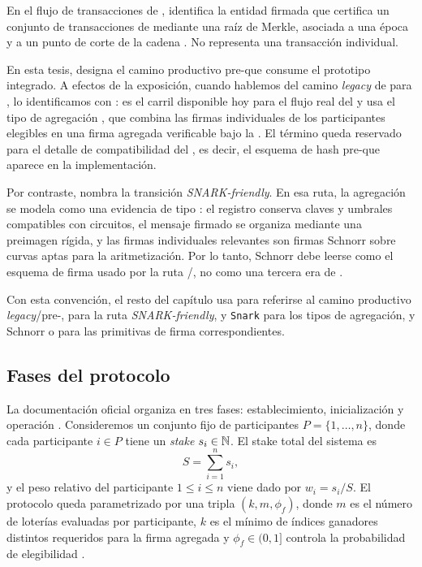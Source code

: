 En el flujo de transacciones de \Mithril, \CardanoTransactions identifica la entidad firmada que certifica un conjunto de transacciones de \Cardano mediante una raíz de Merkle, asociada a una época y a un punto de corte de la cadena \cite{MithrilDocsTransactions}. No representa una transacción individual.

En esta tesis, \Pythagoras designa el camino productivo pre-\Lagrange que consume el prototipo integrado. A efectos de la exposición, cuando hablemos del camino \textit{legacy} de \Mithril para \CardanoTransactions, lo identificamos con \Pythagoras: es el carril disponible hoy para el flujo real del \MithrilAggregator y usa el tipo de agregación \Concatenation, que combina las firmas individuales \BLS de los participantes elegibles en una firma agregada verificable bajo la \AVK \cite{MithrilSTMRepo}. El término \LegacyHashScheme queda reservado para el detalle de compatibilidad del \ProtocolMsg, es decir, el esquema de hash pre-\Lagrange que aparece en la implementación.

Por contraste, \Lagrange nombra la transición \textit{SNARK-friendly}. En esa ruta, la agregación se modela como una evidencia de tipo \SNARK: el registro conserva claves y umbrales compatibles con circuitos, el mensaje firmado se organiza mediante una preimagen rígida, y las firmas individuales relevantes son firmas Schnorr sobre curvas aptas para la aritmetización. Por lo tanto, Schnorr debe leerse como el esquema de firma usado por la ruta \Lagrange/\SNARK, no como una tercera era de \Mithril.

Con esta convención, el resto del capítulo usa \Pythagoras para referirse al camino productivo \textit{legacy}/pre-\Lagrange, \Lagrange para la ruta \textit{SNARK-friendly}, \Concatenation y \texttt{Snark} para los tipos de agregación, y Schnorr o \BLS para las primitivas de firma correspondientes.

\subsection{Fases del protocolo}
\label{subsec:protocolo-stm-y-esquemas-de-firma-fases-del-protocolo}

La documentación oficial organiza \Mithril en tres fases: establecimiento, inicialización y operación \cite{MithrilDocsProtocol}. Consideremos un conjunto fijo de participantes $P = \{1,\ldots,n\}$, donde cada participante $i \in P$ tiene un \textit{stake} $s_i \in \mathbb{N}$. El stake total del sistema es
$$S = \sum_{i=1}^{n} s_i,$$
y el peso relativo del participante $1 \leq i \leq n$ viene dado por $w_i = s_i/S$. El protocolo queda parametrizado por una tripla $(k,m,\phi_f)$, donde $m$ es el número de loterías evaluadas por participante, $k$ es el mínimo de índices ganadores distintos requeridos para la firma agregada y $\phi_f \in (0,1]$ controla la probabilidad de elegibilidad \cite{cryptoeprint:2021/916,MithrilDocsProtocol}.

